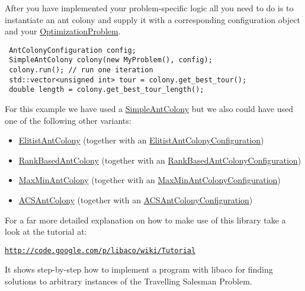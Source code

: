 After you have implemented your problem-specific logic all you need to do is to instantiate an ant colony and supply it with a corresponding configuration object and your \hyperlink{classOptimizationProblem}{OptimizationProblem}.



\begin{Code}\begin{verbatim} AntColonyConfiguration config;
 SimpleAntColony colony(new MyProblem(), config);
 colony.run(); // run one iteration
 std::vector<unsigned int> tour = colony.get_best_tour();
 double length = colony.get_best_tour_length();
\end{verbatim}
\end{Code}



For this example we have used a \hyperlink{classSimpleAntColony}{SimpleAntColony} but we also could have used one of the following other variants:

\begin{itemize}
\item \hyperlink{classElitistAntColony}{ElitistAntColony} (together with an \hyperlink{classElitistAntColonyConfiguration}{ElitistAntColonyConfiguration})\item \hyperlink{classRankBasedAntColony}{RankBasedAntColony} (together with an \hyperlink{classRankBasedAntColonyConfiguration}{RankBasedAntColonyConfiguration})\item \hyperlink{classMaxMinAntColony}{MaxMinAntColony} (together with an \hyperlink{classMaxMinAntColonyConfiguration}{MaxMinAntColonyConfiguration})\item \hyperlink{classACSAntColony}{ACSAntColony} (together with an \hyperlink{classACSAntColonyConfiguration}{ACSAntColonyConfiguration})\end{itemize}


For a far more detailed explanation on how to make use of this library take a look at the tutorial at:

\href{http://code.google.com/p/libaco/wiki/Tutorial}{\tt http://code.google.com/p/libaco/wiki/Tutorial}

It shows step-by-step how to implement a program with libaco for finding solutions to arbitrary instances of the Travelling Salesman Problem. 